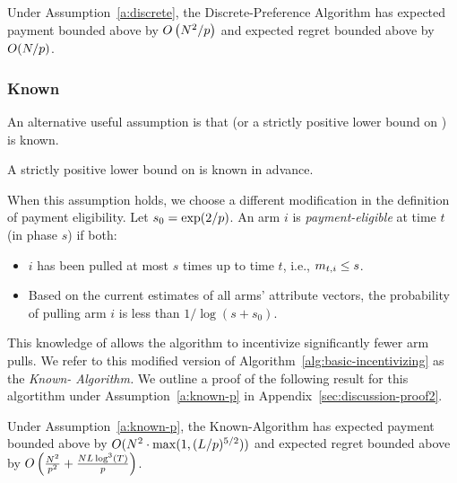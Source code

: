 \begin{theorem}
\label{rst:discrete}
Under Assumption~\ref{a:discrete}, the Discrete-Preference Algorithm
has expected payment bounded above by 
$O \left(N^2/p \right)$
and expected regret bounded above by $O(N / p)$.
\end{theorem}

\subsubsection{Known \MinProb}
An alternative useful assumption is that \MinProb
(or a strictly positive lower bound on \MinProb) is known. 

\begin{assumption}
\label{a:known-p}
A strictly positive lower bound on \MinProb is known in advance.
\end{assumption}

When this assumption holds, we choose a different modification in the
definition of payment eligibility.
Let $s_0 = \exp(2/p)$.
An arm $i$ is \emph{payment-eligible} at time $t$ (in phase $s$)
if both:
\begin{itemize}
\item $i$ has been pulled at most
$s$ times up to time $t$, i.e., $m_{t,i} \leq s$.
\item Based on the current estimates  of all arms' attribute vectors,
the probability of pulling arm $i$ is less than $1/\log(s+s_0)$.
\end{itemize}

This knowledge of \MinProb allows the algorithm to incentivize
significantly fewer arm pulls.
We refer to this modified version of
Algorithm~\ref{alg:basic-incentivizing} as the \emph{Known-\MinProb
Algorithm.}
We outline a proof of the following result for this algortithm under
Assumption~\ref{a:known-p} in Appendix~\ref{sec:discussion-proof2}.

\begin{theorem}
\label{rst:known-p}
Under Assumption~\ref{a:known-p}, the Known-\MinProb Algorithm has
expected payment  bounded above by  
$O(N^2 \cdot \max(1,(L/p)^{5/2}))$ 
and expected regret bounded above by
$O \left( \frac{N^2}{p^2}
  +\frac{N L \log^3(T)}{p}\right)$.
\end{theorem}

